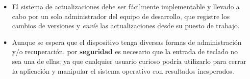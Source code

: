 \begin{itemize}
	\item El sistema de actualizaciones debe ser fácilmente implementable y llevado a cabo por un solo administrador del equipo de desarrollo, que registre los cambios de versiones y \textit{envíe} las actualizaciones desde su puesto de trabajo.
	\item Aunque se espera que el dispositivo tenga diversas formas de administración y/o recuperación, por \textbf{seguridad} es necesario que la entrada de teclado no sea una de ellas; ya que cualquier usuario curioso podría utilizarlo para cerrar la aplicación y manipular el sistema operativo con resultados inesperados.
\end{itemize}

\newpage